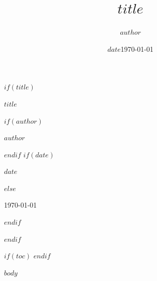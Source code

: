 \documentclass[$if(cjk)$scheme=chinese,$else$scheme=plain,$endif$12pt, openany, a4paper]{ctexbook}
\title{$title$}
\author{$author$}
\date{$date$}
\date{\today}
\begin{document}
\frontmatter

$if(title)$
\begin{titlepage}
    \centering
    \vspace*{4cm}
    {\Huge\bfseries $title$ \par}
    \vspace{1cm}
$if(author)$
    {\Large $author$ \par}
$endif$
    \vfill
$if(date)$
    {\large $date$ \par}
$else$
    {\large \today \par}
$endif$
\end{titlepage}
$endif$

$if(toc)$
\tableofcontents
$endif$

\mainmatter
$body$
\end{document}
